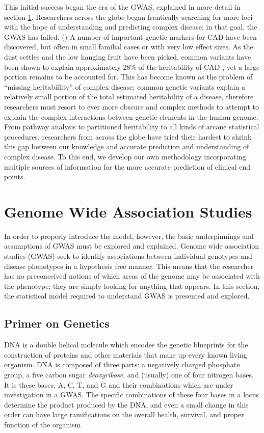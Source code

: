 This initial success began the era of the \ac{GWAS}, explained in more detail in section \ref{gwas}.  Researchers across the globe began frantically searching for more loci with the hope of understanding and predicting complex disease; in that goal, the \ac{GWAS} has failed. (\cite{Visscher2012}) A number of important genetic markers for \ac{CAD} have been discovered, but often in small familial cases or with very low effect sizes. As the dust settles and the low hanging fruit have been picked, common variants have been shown to explain approximately 28\% of the heritability of \ac{CAD} \citep{TheCARDIoGRAMplusC4DConsortium2015}, yet a large portion remains to be accounted for. This has become known as the problem of ``missing heritabillity'' of complex disease; common genetic variants explain a relatively small portion of the total estimated heritability of a disease, therefore researchers must resort to ever more obscure and complex methods to attempt to explain the complex interactions between genetic elements in the human genome. From pathway analysis to partitioned heritability to all kinds of arcane statistical procedures, researchers from across the globe have tried their hardest to shrink this gap between our knowledge and accurate prediction and understanding of complex disease. To this end, we develop our own methodology incorporating multiple sources of information for the more accurate prediction of clinical end points. 

\section{Genome Wide Association Studies} \label{gwas}

In order to properly introduce the model, however, the basic underpinnings and assumptions of \ac{GWAS} must be explored and explained. Genome wide association studies (GWAS) seek to identify associations between individual genotypes and disease phenotypes in a hypothesis free manner. This means that the researcher has no preconceived notions of which areas of the genome may be associated with the phenotype; they are simply looking for anything that appears. In this section, the statistical model required to understand \ac{GWAS} is presented and explored.

\subsection{Primer on Genetics}

\ac{DNA} is a double helical molecule which encodes the genetic blueprints for the construction of proteins and other materials that make up every known living organism. \ac{DNA} is composed of three parts: a negatively charged phosphate group, a five carbon sugar \textit{deoxyribose}, and (usually) one of four nitrogen bases. It is these bases, \ac{A}, \ac{C}, \ac{T}, and \ac{G} and their combinations which are under investigation in a \ac{GWAS}. The specific combinations of these four bases in a \ac{locus} determine the product produced by the \ac{DNA}, and even a small change in this order can have large ramifications on the overall health, survival, and proper function of the organism. 

